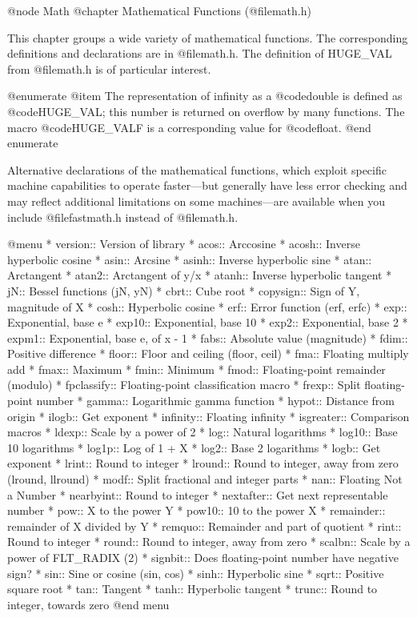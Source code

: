 @node Math
@chapter Mathematical Functions (@file{math.h})

This chapter groups a wide variety of mathematical functions.  The
corresponding definitions and declarations are in @file{math.h}.  
The definition of HUGE_VAL from @file{math.h} is of particular interest.

@enumerate
@item
The representation of infinity as a @code{double} is defined as
@code{HUGE_VAL}; this number is returned on overflow by many functions.
The macro @code{HUGE_VALF} is a corresponding value for @code{float}.
@end enumerate

Alternative declarations of the mathematical functions, which exploit
specific machine capabilities to operate faster---but generally have
less error checking and may reflect additional limitations on some
machines---are available when you include @file{fastmath.h} instead of
@file{math.h}.

@menu 
* version::	Version of library
* acos::	Arccosine
* acosh::	Inverse hyperbolic cosine
* asin::	Arcsine
* asinh::	Inverse hyperbolic sine
* atan::	Arctangent
* atan2::	Arctangent of y/x
* atanh::	Inverse hyperbolic tangent
* jN::	        Bessel functions (jN, yN)
* cbrt::	Cube root
* copysign::	Sign of Y, magnitude of X
* cosh::	Hyperbolic cosine
* erf::		Error function (erf, erfc)
* exp::		Exponential, base e
* exp10::	Exponential, base 10
* exp2::	Exponential, base 2
* expm1::	Exponential, base e, of x - 1
* fabs::	Absolute value (magnitude)
* fdim::	Positive difference
* floor::	Floor and ceiling (floor, ceil)
* fma::		Floating multiply add
* fmax::	Maximum
* fmin::	Minimum
* fmod::	Floating-point remainder (modulo)
* fpclassify::	Floating-point classification macro
* frexp::	Split floating-point number
* gamma::	Logarithmic gamma function
* hypot::	Distance from origin
* ilogb::	Get exponent
* infinity::	Floating infinity
* isgreater::	Comparison macros
* ldexp::	Scale by a power of 2
* log::		Natural logarithms
* log10::	Base 10 logarithms
* log1p::	Log of 1 + X
* log2::	Base 2 logarithms
* logb::	Get exponent
* lrint::	Round to integer
* lround::	Round to integer, away from zero (lround, llround)
* modf::	Split fractional and integer parts
* nan::		Floating Not a Number
* nearbyint::	Round to integer
* nextafter::	Get next representable number
* pow::		X to the power Y
* pow10::	10 to the power X
* remainder::	remainder of X divided by Y 
* remquo::	Remainder and part of quotient
* rint::	Round to integer
* round::	Round to integer, away from zero
* scalbn::	Scale by a power of FLT_RADIX (2)
* signbit::	Does floating-point number have negative sign?
* sin::		Sine or cosine (sin, cos)
* sinh::	Hyperbolic sine
* sqrt::	Positive square root
* tan::		Tangent
* tanh::	Hyperbolic tangent
* trunc::	Round to integer, towards zero
@end menu

